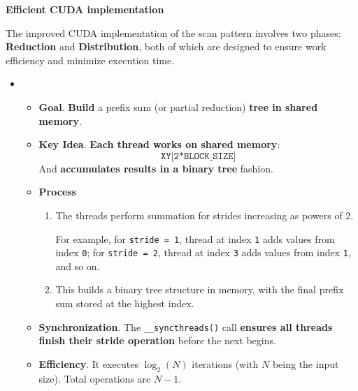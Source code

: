 \newpage

\begin{flushleft}
    \textcolor{Green3}{\faIcon{\speedIcon} \textbf{Efficient CUDA implementation}}
\end{flushleft}
The improved CUDA implementation of the scan pattern involves two phases: \textbf{Reduction} and \textbf{Distribution}, both of which are designed to ensure work efficiency and minimize execution time.
\begin{itemize}
    \item {}
    \begin{itemize}
        \item[\textcolor{Green3}{\faIcon{book}}] \textcolor{Green3}{\textbf{Goal}}. \textbf{Build} a prefix sum (or partial reduction) \textbf{tree in shared memory}.

        \item[\textcolor{Green3}{\faIcon{lightbulb}}] \textcolor{Green3}{\textbf{Key Idea}}. \textbf{Each thread works on shared memory}:
        \begin{equation*}
            \texttt{XY[2*BLOCK\_SIZE]}
        \end{equation*}
        And \textbf{accumulates results in a binary tree} fashion.

        \item[\textcolor{Green3}{\faIcon{tools}}] \textcolor{Green3}{\textbf{Process}}
        \begin{enumerate}
            \item The threads perform summation for strides increasing as powers of 2.
            
            For example, for \texttt{stride = 1}, thread at index \texttt{1} adds values from index \texttt{0}; for \texttt{stride = 2}, thread at index \texttt{3} adds values from index \texttt{1}, and so on.
            \item This builds a binary tree structure in memory, with the final prefix sum stored at the highest index.
        \end{enumerate}

        \item[\textcolor{Green3}{\faIcon{clock}}] \textcolor{Green3}{\textbf{Synchronization}}. The \texttt{\_\_syncthreads()} call \textbf{ensures all threads finish their stride operation} before the next begins.

        \item[\textcolor{Green3}{\faIcon{check-circle}}] \textcolor{Green3}{\textbf{Efficiency}}. It executes $\log_{2}\left(N\right)$ iterations (with $N$ being the input size). Total operations are $N - 1$.
    \end{itemize}


\end{itemize}
